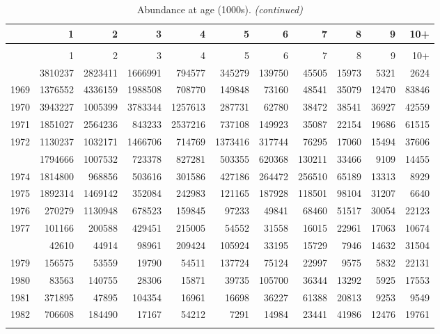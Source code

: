 \documentclass[
]{article}
\begin{document}
\begin{longtable}[t]{lrrrrrrrrrr}
\caption{\label{tab:NAA-table}Abundance at age (1000s).}\\
\toprule
  & 1 & 2 & 3 & 4 & 5 & 6 & 7 & 8 & 9 & 10+\\
\midrule
\endfirsthead
\caption[]{Abundance at age (1000s). \textit{(continued)}}\\
\toprule
  & 1 & 2 & 3 & 4 & 5 & 6 & 7 & 8 & 9 & 10+\\
\midrule
\endhead

\endfoot
\bottomrule
\endlastfoot
1968 & 3810237 & 2823411 & 1666991 & 794577 & 345279 & 139750 & 45505 & 15973 & 5321 & 2624\\
1969 & 1376552 & 4336159 & 1988508 & 708770 & 149848 & 73160 & 48541 & 35079 & 12470 & 83846\\
1970 & 3943227 & 1005399 & 3783344 & 1257613 & 287731 & 62780 & 38472 & 38541 & 36927 & 42559\\
1971 & 1851027 & 2564236 & 843233 & 2537216 & 737108 & 149923 & 35087 & 22154 & 19686 & 61515\\
1972 & 1130237 & 1032171 & 1466706 & 714769 & 1373416 & 317744 & 76295 & 17060 & 15494 & 37606\\
\addlinespace
1973 & 1794666 & 1007532 & 723378 & 827281 & 503355 & 620368 & 130211 & 33466 & 9109 & 14455\\
1974 & 1814800 & 968856 & 503616 & 301586 & 427186 & 264472 & 256510 & 65189 & 13313 & 8929\\
1975 & 1892314 & 1469142 & 352084 & 242983 & 121165 & 187928 & 118501 & 98104 & 31207 & 6640\\
1976 & 270279 & 1130948 & 678523 & 159845 & 97233 & 49841 & 68460 & 51517 & 30054 & 22123\\
1977 & 101166 & 200588 & 429451 & 215005 & 54552 & 31558 & 16015 & 22961 & 17063 & 10674\\
\addlinespace
1978 & 42610 & 44914 & 98961 & 209424 & 105924 & 33195 & 15729 & 7946 & 14632 & 31504\\
1979 & 156575 & 53559 & 19790 & 54511 & 137724 & 75124 & 22997 & 9575 & 5832 & 22131\\
1980 & 83563 & 140755 & 28306 & 15871 & 39735 & 105700 & 36344 & 13292 & 5925 & 17553\\
1981 & 371895 & 47895 & 104354 & 16961 & 16698 & 36227 & 61388 & 20813 & 9253 & 9549\\
1982 & 706608 & 184490 & 17167 & 54212 & 7291 & 14984 & 23441 & 41986 & 12476 & 19761\\
\addlinespace

\end{longtable}
\end{document}
